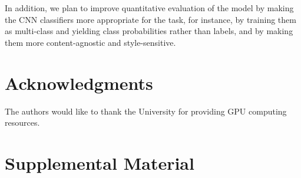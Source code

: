\documentclass[11pt,a4paper]{article}
\begin{document}
In addition, we plan to improve quantitative evaluation of the model by making the CNN classifiers more appropriate for the task, for instance, by training them as multi-class and yielding class probabilities rather than labels, and by making them more content-agnostic and style-sensitive.

\section*{Acknowledgments}

The authors would like to thank the University for providing GPU computing resources. \\




\appendix

\section{Supplemental Material}
\label{sec:supplemental}
\end{document}
